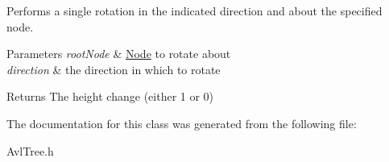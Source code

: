 Performs a single rotation in the indicated direction and about the specified node. 


\begin{DoxyParams}{Parameters}
{\em root\-Node} & \hyperlink{structAVLTree_1_1Node}{Node} to rotate about \\
\hline
{\em direction} & the direction in which to rotate\\
\hline
\end{DoxyParams}
\begin{DoxyReturn}{Returns}
The height change (either 1 or 0) 
\end{DoxyReturn}


The documentation for this class was generated from the following file\-:\begin{DoxyCompactItemize}
\item 
Avl\-Tree.\-h\end{DoxyCompactItemize}
